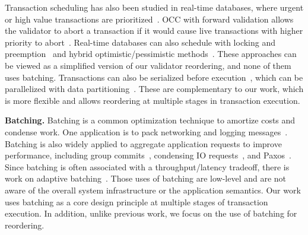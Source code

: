 Transaction scheduling has also been studied in real-time databases, where urgent or high value transactions are prioritized~\cite{haritsa1993value}.
OCC with forward validation allows the validator to abort a transaction if it would cause live transactions with higher priority to abort~\cite{haritsa1990dynamic, lam1995real,lee1993using}. Real-time databases can also schedule with locking and preemption~\cite{abbott1992scheduling} and hybrid optimistic/pessimistic methods~\cite{huang1991experimental, lin1990concurrency}. These approaches can be viewed as a simplified version of our validator reordering, and none of them uses batching. 
Transactions can also be serialized before execution~\cite{thomson2012calvin, mu2014extracting, faleiro2014rethinking}, which can be parallelized with data partitioning~\cite{qadah2018quecc}. These are complementary to our work, which is more flexible and allows reordering at multiple stages in transaction execution.

{\bf Batching.}
Batching is a common optimization technique to amortize costs and condense work. One application is to pack networking and logging messages~\cite{castro2002practical,ding2015centiman,friedman1997packing,glendenning2011scalable}. Batching is also widely applied to aggregate application requests to improve performance, including group commits~\cite{debrabant2013anti,hagmann1987reimplementing}, condensing IO requests~\cite{debrabant2013anti, faleiro2014lazy}, and Paxos~\cite{santos2012tuning}.
Since batching is often associated with a throughput/latency tradeoff, there is work on adaptive batching~\cite{friedman2006adaptive, nagle1984congestion}.
Those uses of batching are low-level and are not aware of the overall system infrastructure or the application semantics. Our work uses batching as a core design principle at multiple stages of transaction execution. In addition, unlike previous work, we focus on the use of batching for reordering.

